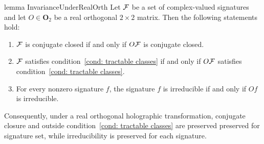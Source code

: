 \begin{restatable}{lemma}
{InvarianceUnderRealOrth}\label{lem: invariance under real orthogonal transformation}
Let $\mathcal{F}$ be a set of complex-valued signatures and let $O\in \mathbf{O}_2$ be a real orthogonal $2\times 2$ matrix. Then the following statements hold:
\begin{enumerate}
    \item $\mathcal{F}$ is conjugate closed if and only if $O\mathcal{F}$ is conjugate closed.
    \item $\mathcal{F}$ satisfies condition~\eqref{cond: tractable classes} if and only if $O\mathcal{F}$ satisfies condition~\eqref{cond: tractable classes}.
    \item For every nonzero signature $f$, the signature $f$ is irreducible if and only if $Of$ is irreducible.
\end{enumerate}
Consequently, under a real orthogonal holographic transformation, conjugate closure and outside condition~\eqref{cond: tractable classes} are preserved preserved for signature set, while irreducibility is preserved for each signature.
\end{restatable}

